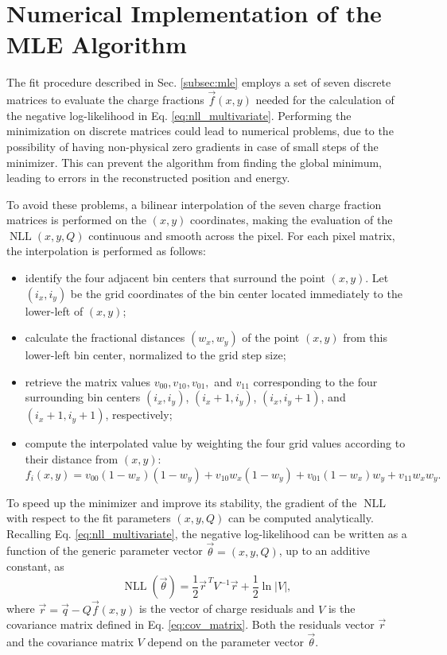 \appendix

\chapter{Numerical Implementation of the MLE Algorithm}
\label{appendix:mle}
The fit procedure described in Sec. \ref{subsec:mle} employs a set of seven discrete matrices to evaluate the charge fractions $\vec{f}(x, y)$ needed for the calculation of the negative log-likelihood in Eq. \ref{eq:nll_multivariate}. Performing the minimization on discrete matrices could lead to numerical problems, due to the possibility of having non-physical zero gradients in case of small steps of the minimizer. This can prevent the algorithm from finding the global minimum, leading to errors in the reconstructed position and energy.

To avoid these problems, a bilinear interpolation of the seven charge fraction matrices is performed on the $(x, y)$ coordinates, making the evaluation of the $\operatorname{NLL}(x, y, Q)$ continuous and smooth across the pixel. For each pixel matrix, the interpolation is performed as follows:

\begin{itemize}[label=-]
\item identify the four adjacent bin centers that surround the point $(x, y)$. Let $(i_x, i_y)$ be the grid coordinates of the bin center located immediately to the lower-left of $(x, y)$;
\item calculate the fractional distances $(w_x, w_y)$ of the point $(x, y)$ from this lower-left bin center, normalized to the grid step size;
\item retrieve the matrix values $v_{00}, v_{10}, v_{01},$ and $v_{11}$ corresponding to the four surrounding bin centers $(i_x, i_y)$, $(i_x + 1, i_y)$, $(i_x, i_y + 1)$, and $(i_x + 1, i_y + 1)$, respectively;
\item compute the interpolated value by weighting the four grid values according to their distance from $(x, y)$:
\begin{equation}
f_i (x, y) = v_{00} (1 - w_x) (1 - w_y) + v_{10} w_x (1 - w_y) + v_{01} (1 - w_x) w_y + v_{11} w_x w_y.
\label{eq:interpolation}
\end{equation}
\end{itemize}

To speed up the minimizer and improve its stability, the gradient of the $\operatorname{NLL}$ with respect to the fit parameters $(x, y, Q)$ can be computed analytically. Recalling Eq. \ref{eq:nll_multivariate}, the negative log-likelihood can be written as a function of the generic parameter vector $\vec{\theta} = (x, y, Q)$, up to an additive constant, as
\begin{equation}
\operatorname{NLL}(\vec{\theta}) = \frac{1}{2} \vec{r}^{\,T} V^{-1} \vec{r} + \frac{1}{2} \ln |V|,
\end{equation}
where $\vec{r} = \vec{q} - Q \vec{f}(x, y)$ is the vector of charge residuals and $V$ is the covariance matrix defined in Eq. \ref{eq:cov_matrix}. Both the residuals vector $\vec{r}$ and the covariance matrix $V$ depend on the parameter vector $\vec{\theta}$.


